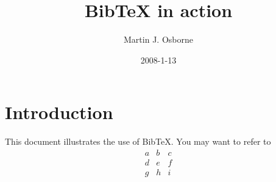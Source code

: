 \documentclass[12pt]{article}
\begin{document}
\title{BibTeX in action}
\author{Martin J. Osborne}
\date{2008-1-13}

\maketitle

\section{Introduction}
This document illustrates the use of BibTeX\@.  You may want to refer to
\cite{LimitBound2}
\[
 \begin{matrix}
  a & b & c \\
  d & e & f \\
  g & h & i
 \end{matrix}
\]



\end{document}

